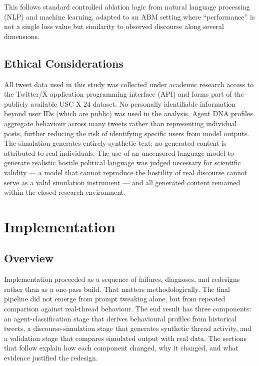 \documentclass[logo,bsc,singlespacing,parskip,online]{infthesis}
\begin{document}
This follows standard controlled ablation logic from natural language processing (NLP) and machine learning, adapted to an ABM setting where ``performance'' is not a single loss value but similarity to observed discourse along several dimensions.

\section{Ethical Considerations}

All tweet data used in this study was collected under academic research access to the Twitter/X application programming interface (API) and forms part of the publicly available USC X 24 dataset. No personally identifiable information beyond user IDs (which are public) was used in the analysis. Agent DNA profiles aggregate behaviour across many tweets rather than representing individual posts, further reducing the risk of identifying specific users from model outputs. The simulation generates entirely synthetic text; no generated content is attributed to real individuals. The use of an uncensored language model to generate realistic hostile political language was judged necessary for scientific validity --- a model that cannot reproduce the hostility of real discourse cannot serve as a valid simulation instrument --- and all generated content remained within the closed research environment.

\chapter{Implementation}

\section{Overview}

Implementation proceeded as a sequence of failures, diagnoses, and redesigns rather than as a one-pass build. That matters methodologically. The final pipeline did not emerge from prompt tweaking alone, but from repeated comparison against real-thread behaviour. The end result has three components: an agent-classification stage that derives behavioural profiles from historical tweets, a discourse-simulation stage that generates synthetic thread activity, and a validation stage that compares simulated output with real data. The sections that follow explain how each component changed, why it changed, and what evidence justified the redesign.
\end{document}
